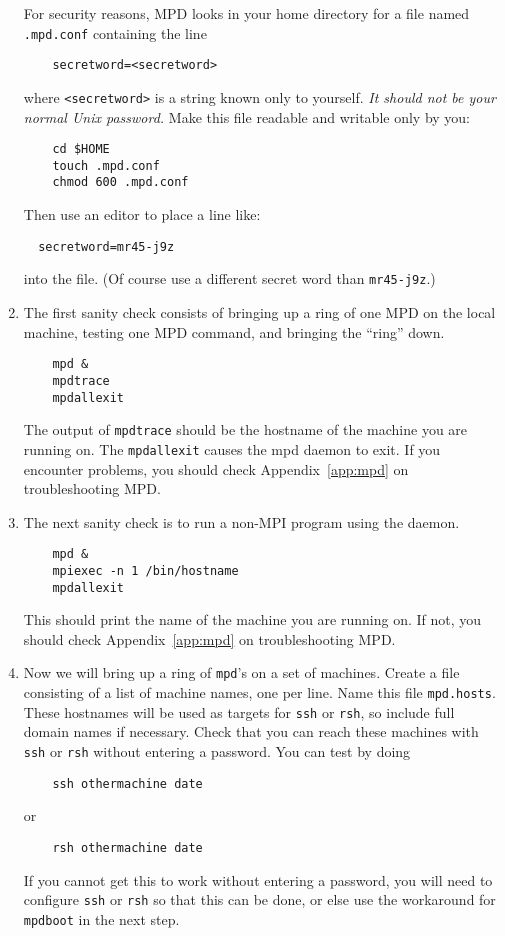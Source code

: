 \documentclass[dvipdfm,11pt]{article}
\begin{document}
\begin{enumerate}
For security reasons, MPD looks in your home directory for a file named
\texttt{.mpd.conf} containing the line
\begin{verbatim}
    secretword=<secretword>
\end{verbatim}
where \verb+<secretword>+ is a string known only to yourself.  {\em It should
not be your normal Unix password.}  Make this file readable and writable
only by you:
\begin{verbatim}
    cd $HOME
    touch .mpd.conf
    chmod 600 .mpd.conf
\end{verbatim}
Then use an editor to place a line like:
\begin{verbatim}
  secretword=mr45-j9z
\end{verbatim}
into the file.
(Of course use a different secret word than \verb+mr45-j9z+.)

\item
The first sanity check consists of bringing up a ring of one MPD on
the local machine, testing one MPD command, and bringing the ``ring''
down. 
\begin{verbatim}
    mpd & 
    mpdtrace
    mpdallexit
\end{verbatim}
The output of \texttt{mpdtrace} should be the hostname of the machine you are
running on.  The \texttt{mpdallexit} causes the mpd daemon to exit.
If you encounter problems, you should check Appendix~\ref{app:mpd} on
troubleshooting MPD. 

\item
The next sanity check is to run a non-MPI program using the daemon.
\begin{verbatim}
    mpd & 
    mpiexec -n 1 /bin/hostname
    mpdallexit
\end{verbatim}
This should print the name of the machine you are running on.  If not,
you should check Appendix~\ref{app:mpd} on
troubleshooting MPD.

\item
Now we will bring up a ring of \texttt{mpd}'s on a set of machines.  Create
a file consisting of a list of machine names, one per line.  Name this
file \texttt{mpd.hosts}.  These hostnames will be used as targets for
\texttt{ssh} or \texttt{rsh}, so include full domain names if necessary.  Check that you
can reach these machines with \texttt{ssh} or \texttt{rsh} without
entering a password.  You can test by doing
\begin{verbatim}
    ssh othermachine date
\end{verbatim}
or
\begin{verbatim}
    rsh othermachine date
\end{verbatim}
If you cannot get this to work without entering a password, you will
need to configure \texttt{ssh} or \texttt{rsh} so that this can be done,
or else use the workaround for \texttt{mpdboot} in the next step.


\end{enumerate}
\end{document}
